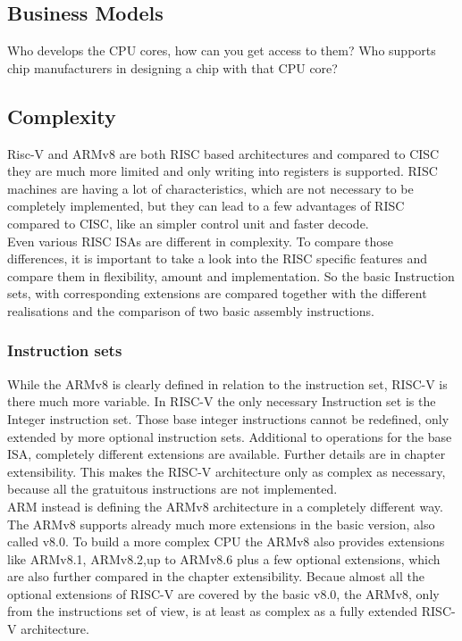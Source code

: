 \documentclass[conference]{IEEEtran}
\begin{document}
	\subsection{Business Models}
	Who develops the CPU cores, how can you get access to them? Who supports chip manufacturers in designing a chip with that CPU core?
	\subsection{Complexity}
	Risc-V and ARMv8 are both \gls{RISC} based architectures and compared to \gls{CISC} they are much more limited and only writing into registers is supported. \gls{RISC} machines are having a lot of characteristics, which are not necessary to be completely implemented, but they can lead to a few advantages of \gls{RISC} compared to \gls{CISC}, like an simpler control unit and faster decode. \cite{George1990} \\
Even various \gls{RISC} \glspl{ISA} are different in complexity. To compare those differences, it is important to take a look into the RISC specific features and compare them in flexibility, amount and implementation. So the basic Instruction sets, with corresponding extensions are compared together with the different realisations and the comparison of two basic assembly instructions.
	\subsubsection{Instruction sets}
	While the ARMv8 is clearly defined in relation to the instruction set, RISC-V is there much more variable. In RISC-V the only necessary Instruction set is the Integer instruction set. Those base integer instructions cannot be redefined, only extended by more optional instruction sets. Additional to operations for the base \gls{ISA}, completely different extensions are available. Further details are in chapter extensibility.
This makes the RISC-V architecture only as complex as necessary, because all the gratuitous instructions are not implemented. \cite{Asanovic2016} \\
ARM instead is defining the ARMv8 architecture in a completely different way. The ARMv8 supports already much more extensions in the basic version, also called v8.0. To build a more complex CPU the ARMv8 also provides extensions like ARMv8.1, ARMv8.2,up to ARMv8.6 plus a few optional extensions, which are also further compared in the chapter extensibility. Becaue almost all the optional extensions of RISC-V are covered by the basic v8.0, the ARMv8, only from the instructions set of view, is at least as complex as a fully extended RISC-V architecture. 
\cite{ArmManual} \\
\end{document}
